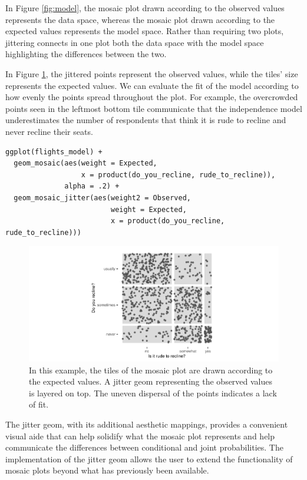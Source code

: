 In Figure \ref{fig:model}, the mosaic plot drawn according to the observed values represents the data space, whereas the mosaic plot drawn according to the expected values represents the model space. Rather than requiring two plots, jittering connects in one plot both the data space with the model space highlighting the differences between the two.

In Figure \ref{fig:weight2}, the jittered points represent the observed values, while the tiles' size represents the expected values. We can evaluate the fit of the model according to how evenly the points spread throughout the plot. For example, the overcrowded points seen in the leftmost bottom tile communicate that the independence model underestimates the number of respondents that think it is rude to recline and never recline their seats.

\begin{verbatim}
ggplot(flights_model) + 
  geom_mosaic(aes(weight = Expected, 
                  x = product(do_you_recline, rude_to_recline)), 
              alpha = .2) +
  geom_mosaic_jitter(aes(weight2 = Observed, 
                         weight = Expected, 
                         x = product(do_you_recline, rude_to_recline)))
\end{verbatim}

\begin{figure}

{\centering \includegraphics[width=1\linewidth]{RJ-2023-013_files/figure-latex/weight2-1} 

}

\caption{In this example, the tiles of the mosaic plot are drawn according to the expected values. A jitter geom representing the observed values is layered on top. The uneven dispersal of the points indicates a lack of fit.}\label{fig:weight2}
\end{figure}

The jitter geom, with its additional aesthetic mappings, provides a convenient visual aide that can help solidify what the mosaic plot represents and help communicate the differences between conditional and joint probabilities. The implementation of the jitter geom allows the user to extend the functionality of mosaic plots beyond what has previously been available.

